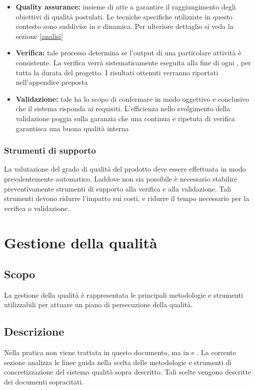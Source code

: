 \documentclass[12pt,a4paper]{article}
\begin{document}
\begin{itemize}
	\item \textbf{Quality assurance:} insieme di   atte a garantire il raggiungimento degli obiettivi di qualità postulati. 
	Le tecniche specifiche utilizzate in questo contesto sono suddivise in   e dinamica. Per ulteriore dettaglio si veda la sezione \ref{analisi}
	\item \textbf{Verifica:} tale processo determina se l'output di una particolare attività è consistente. La verifica verrà sistematicamente eseguita alla fine di ogni , per tutta la durata del progetto. I risultati ottenuti verranno riportati nell'appendice preposta
	\item \textbf{Validazione:} tale   ha lo scopo di confermare in modo oggettivo e conclusivo che il sistema risponda ai requisiti. L'efficienza nello svolgimento della validazione poggia sulla garanzia che una continua e ripetuta  di verifica garantisca una buona qualità interna
\end{itemize}

\subsubsection{Strumenti di supporto}
La valutazione del grado di qualità del prodotto deve essere effettuata in modo prevalentemente automatico. Laddove non sia possibile è necessario stabilire preventivamente strumenti di supporto alla verifica e alla validazione. Tali strumenti devono ridurre l'impatto sui costi, e ridurre il tempo necessario per la verifica o validazione. 

\section{Gestione della qualità} \label{gest_qual}

\subsection{Scopo}
La gestione della qualità è rappresentata le principali metodologie e strumenti utilizzabili per attuare un piano di persecuzione della qualità. 

\subsection{Descrizione}
Nella pratica non viene trattata in questo documento, ma in \PdP{} e \NdP{}. La corrente sezione analizza le linee guida nella scelta delle metodologie e strumenti di concretizzazione del sistema qualità sopra descritto. Tali scelte vengono descritte dei documenti sopracitati.
\end{document}
